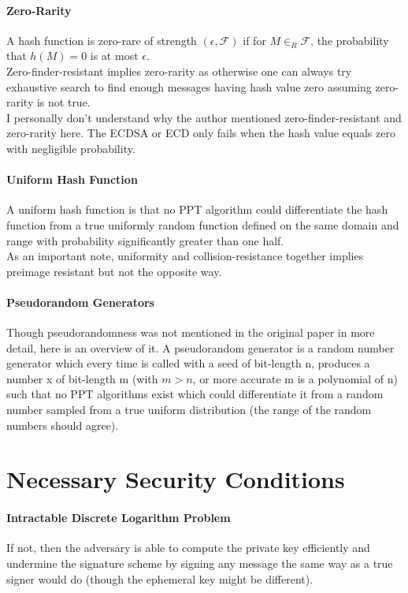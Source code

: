 \documentclass[18]{article}
\begin{document}
\paragraph{Zero-Rarity}
A hash function is zero-rare of strength $(\epsilon, \mathscr{F})$ if for $M\in _R \mathscr{F}$, the probability that $h(M)=0$ is at most $\epsilon$.
\\ Zero-finder-resistant implies zero-rarity as otherwise one can always try exhaustive search to find enough messages having hash value zero assuming zero-rarity is not true.
\\ I personally don't understand why the author mentioned zero-finder-resistant and zero-rarity here. The ECDSA or ECD only fails when the hash value equals zero with negligible probability.


\paragraph{Uniform Hash Function}
A uniform hash function is that no PPT algorithm could differentiate the hash function from a true uniformly random function defined on the same domain and range with probability significantly greater than one half.\\

As an important note, uniformity and collision-resistance together implies preimage resistant but not the opposite way.
\paragraph{Pseudorandom Generators}
Though pseudorandomness was not mentioned in the original paper in more detail, here is an overview of it. A pseudorandom generator is a random number generator which every time is called with a seed of bit-length n, produces a number x of bit-length m (with $m > n$, or more accurate m is a polynomial of n) such that no PPT algorithms exist which could differentiate it from a random number sampled from a true uniform distribution (the range of the random numbers should agree).

\section{Necessary Security Conditions}
\paragraph{Intractable Discrete Logarithm Problem}
If not, then the adversary is able to compute the private key efficiently and undermine the signature scheme by signing any message the same way as a true signer would do (though the ephemeral key might be different).
\end{document}
